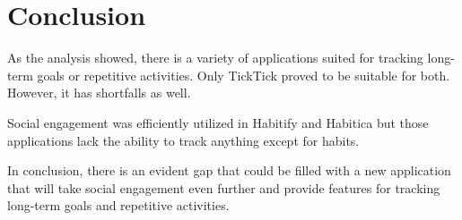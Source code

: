 
\section{Conclusion}\label{sec:conclusion}

As the analysis showed, there is a variety of applications suited for tracking long-term goals or repetitive activities.
Only TickTick proved to be suitable for both.
However, it has shortfalls as well.

Social engagement was efficiently utilized in Habitify and Habitica
but those applications lack the ability to track anything except for habits.

In conclusion, there is an evident gap that could be filled with a new application that will take social engagement even further and provide
features for tracking long-term goals and repetitive activities.